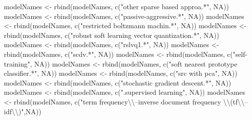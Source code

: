 \documentclass[
]{article}
\newenvironment{Shaded}{\begin{snugshade}}{\end{snugshade}}
\newcommand{\ConstantTok}[1]{\textcolor[rgb]{0.00,0.00,0.00}{#1}}
\newcommand{\FunctionTok}[1]{\textcolor[rgb]{0.00,0.00,0.00}{#1}}
\newcommand{\NormalTok}[1]{#1}
\newcommand{\OtherTok}[1]{\textcolor[rgb]{0.56,0.35,0.01}{#1}}
\newcommand{\SpecialCharTok}[1]{\textcolor[rgb]{0.00,0.00,0.00}{#1}}
\newcommand{\StringTok}[1]{\textcolor[rgb]{0.31,0.60,0.02}{#1}}
\begin{document}
\begin{Shaded}
\begin{Highlighting}[]
\NormalTok{modelNames }\OtherTok{\textless{}{-}} \FunctionTok{rbind}\NormalTok{(modelNames, }\FunctionTok{c}\NormalTok{(}\StringTok{"other sparse based approa.*"}\NormalTok{, }\ConstantTok{NA}\NormalTok{))}
\NormalTok{modelNames }\OtherTok{\textless{}{-}} \FunctionTok{rbind}\NormalTok{(modelNames, }\FunctionTok{c}\NormalTok{(}\StringTok{"passive{-}aggressive.*"}\NormalTok{, }\ConstantTok{NA}\NormalTok{))}
\NormalTok{modelNames }\OtherTok{\textless{}{-}} \FunctionTok{rbind}\NormalTok{(modelNames, }\FunctionTok{c}\NormalTok{(}\StringTok{"restricted boltzmann machin.*"}\NormalTok{, }\ConstantTok{NA}\NormalTok{))}
\NormalTok{modelNames }\OtherTok{\textless{}{-}} \FunctionTok{rbind}\NormalTok{(modelNames, }\FunctionTok{c}\NormalTok{(}\StringTok{"robust soft learning vector quantization.*"}\NormalTok{, }\ConstantTok{NA}\NormalTok{))}
\NormalTok{modelNames }\OtherTok{\textless{}{-}} \FunctionTok{rbind}\NormalTok{(modelNames, }\FunctionTok{c}\NormalTok{(}\StringTok{"rslvq1.*"}\NormalTok{, }\ConstantTok{NA}\NormalTok{))}
\NormalTok{modelNames }\OtherTok{\textless{}{-}} \FunctionTok{rbind}\NormalTok{(modelNames, }\FunctionTok{c}\NormalTok{(}\StringTok{"scdv.*"}\NormalTok{, }\ConstantTok{NA}\NormalTok{))}
\NormalTok{modelNames }\OtherTok{\textless{}{-}} \FunctionTok{rbind}\NormalTok{(modelNames, }\FunctionTok{c}\NormalTok{(}\StringTok{"self{-}training"}\NormalTok{, }\ConstantTok{NA}\NormalTok{))}
\NormalTok{modelNames }\OtherTok{\textless{}{-}} \FunctionTok{rbind}\NormalTok{(modelNames, }\FunctionTok{c}\NormalTok{(}\StringTok{"soft nearest prototype classifier.*"}\NormalTok{, }\ConstantTok{NA}\NormalTok{))}
\NormalTok{modelNames }\OtherTok{\textless{}{-}} \FunctionTok{rbind}\NormalTok{(modelNames, }\FunctionTok{c}\NormalTok{(}\StringTok{"src with pca"}\NormalTok{, }\ConstantTok{NA}\NormalTok{))}
\NormalTok{modelNames }\OtherTok{\textless{}{-}} \FunctionTok{rbind}\NormalTok{(modelNames, }\FunctionTok{c}\NormalTok{(}\StringTok{"stochastic gradient descent.*"}\NormalTok{, }\ConstantTok{NA}\NormalTok{))}
\NormalTok{modelNames }\OtherTok{\textless{}{-}} \FunctionTok{rbind}\NormalTok{(modelNames, }\FunctionTok{c}\NormalTok{(}\StringTok{".supervised learning"}\NormalTok{, }\ConstantTok{NA}\NormalTok{))}
\NormalTok{modelNames }\OtherTok{\textless{}{-}} \FunctionTok{rbind}\NormalTok{(modelNames, }\FunctionTok{c}\NormalTok{(}\StringTok{"term frequency}\SpecialCharTok{\textbackslash{}\textbackslash{}}\StringTok{–inverse document frequency }\SpecialCharTok{\textbackslash{}\textbackslash{}}\StringTok{(tf}\SpecialCharTok{\textbackslash{}\textbackslash{}}\StringTok{–idf}\SpecialCharTok{\textbackslash{}\textbackslash{}}\StringTok{)"}\NormalTok{,}\ConstantTok{NA}\NormalTok{))}

\end{Highlighting}
\end{Shaded}
\end{document}
